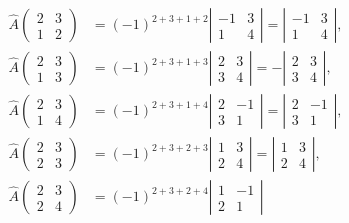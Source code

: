 \documentclass[UTF8,12pt,a4paper,fontset=fandol]{ctexart}
\begin{document}
\[
\begin{array}{rl}
\widehat{A}\left(\begin{array}{cc}2&3\\1&2\end{array}\right)
&=(-1)^{2+3+1+2}\left|\begin{array}{cc}-1&3\\1&4\end{array}\right|
=\left|\begin{array}{cc}-1&3\\1&4\end{array}\right|,\\[1.2em]
\widehat{A}\left(\begin{array}{cc}2&3\\1&3\end{array}\right)
&=(-1)^{2+3+1+3}\left|\begin{array}{cc}2&3\\3&4\end{array}\right|
=-\left|\begin{array}{cc}2&3\\3&4\end{array}\right|,\\[1.2em]
\widehat{A}\left(\begin{array}{cc}2&3\\1&4\end{array}\right)
&=(-1)^{2+3+1+4}\left|\begin{array}{cc}2&-1\\3&1\end{array}\right|
=\left|\begin{array}{cc}2&-1\\3&1\end{array}\right|,\\[1.2em]
\widehat{A}\left(\begin{array}{cc}2&3\\2&3\end{array}\right)
&=(-1)^{2+3+2+3}\left|\begin{array}{cc}1&3\\2&4\end{array}\right|
=\left|\begin{array}{cc}1&3\\2&4\end{array}\right|,\\[1.2em]
\widehat{A}\left(\begin{array}{cc}2&3\\2&4\end{array}\right)
&=(-1)^{2+3+2+4}\left|\begin{array}{cc}1&-1\\2&1\end{array}\right|

\end{array}\]
\end{document}
